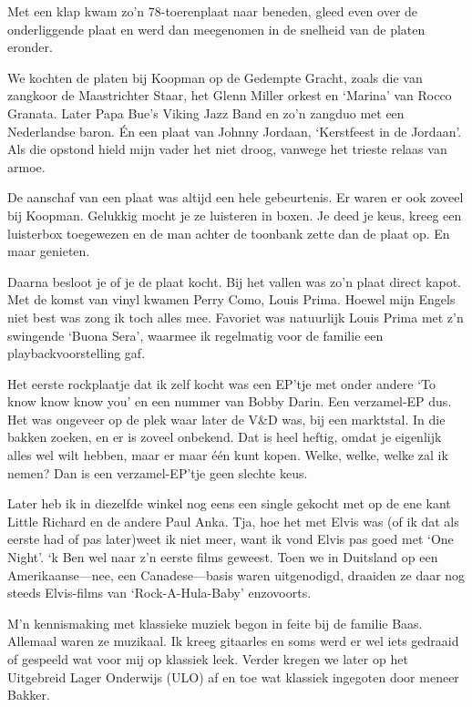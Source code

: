 \documentclass[12pt,twoside, openright]{memoir}
\begin{document}
Met een klap kwam zo’n 78-toerenplaat naar beneden, gleed even over de onderliggende plaat en werd dan meegenomen in de snelheid van de platen eronder. 

We kochten de platen bij Koopman op de Gedempte Gracht, zoals die van zangkoor de Maastrichter Staar, het Glenn Miller orkest en `Marina' van Rocco Granata. Later Papa Bue’s Viking Jazz Band en zo’n zangduo met een Nederlandse baron. Én een plaat van Johnny Jordaan, ‘Kerstfeest in de Jordaan’. Als die opstond hield mijn vader het niet droog, vanwege het trieste relaas van armoe. 

De aanschaf van een plaat was altijd een hele gebeurtenis. Er waren er ook zoveel bij Koopman. Gelukkig mocht je ze luisteren in boxen. Je deed je keus, kreeg een luisterbox toegewezen en de man achter de toonbank zette dan de plaat op. En maar genieten. 

Daarna besloot je of je de plaat kocht. Bij het vallen was zo’n plaat direct kapot. Met de komst van vinyl kwamen Perry Como, Louis Prima. Hoewel mijn Engels niet best was zong ik toch alles mee. Favoriet was natuurlijk Louis Prima met z’n swingende `Buona Sera', waarmee ik regelmatig voor de familie een playbackvoorstelling gaf.


Het eerste rockplaatje dat ik zelf kocht was een EP'tje met onder andere `To know know know you' en een nummer van Bobby Darin. Een verzamel-EP dus. Het was ongeveer op de plek waar later de V\&D was, bij een marktstal. In die bakken zoeken, en er is zoveel onbekend. Dat is heel heftig, omdat je eigenlijk alles wel wilt hebben, maar er maar één kunt kopen. Welke, welke, welke zal ik nemen? Dan is een verzamel-EP'tje geen slechte keus.

Later heb ik in diezelfde winkel nog eens een single gekocht met op de ene kant Little Richard en de andere Paul Anka. Tja, hoe het met Elvis was (of ik dat als eerste had of pas later)weet ik niet meer, want ik vond Elvis pas goed met `One Night'. `k Ben wel naar z'n eerste films geweest. Toen we in Duitsland op een Amerikaanse---nee, een Canadese---basis waren uitgenodigd, draaiden ze daar nog steeds Elvis-films van `Rock-A-Hula-Baby' enzovoorts.

M’n kennismaking met klassieke muziek begon in feite bij de familie Baas. Allemaal waren ze muzikaal. Ik kreeg gitaarles en soms werd er wel iets gedraaid of gespeeld wat voor mij op klassiek leek. Verder kregen we later op het Uitgebreid Lager Onderwijs (ULO) af en toe wat klassiek ingegoten door meneer Bakker. 
\end{document}
